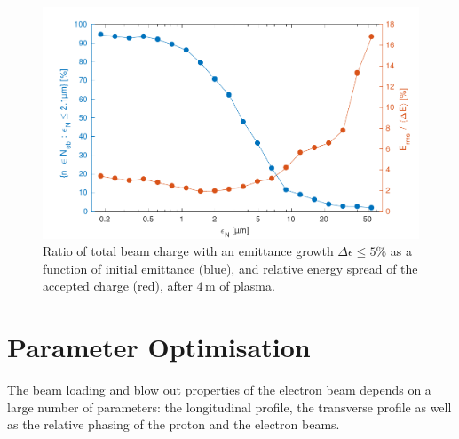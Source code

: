 \documentclass[aps,prstab,reprint,amsmath,amssymb,groupedaddress]{revtex4-1}
\newcommand{\unit}[1]{\,\mathrm{#1}}
\begin{document}
\begin{figure}[hbt]
    \includegraphics[width=\linewidth,trim={2mm 0mm 2mm 0mm},clip]{figures/beamQualityEmittance}
    \caption{\label{Fig:BeamQEmit} Ratio of total beam charge with an emittance growth $\Delta\epsilon \leq 5\%$ as a
        function of initial emittance (blue), and relative energy spread of the accepted charge (red), after $4\unit{m}$
        of plasma.}
\end{figure}

\section{Parameter Optimisation}\label{S:PO}

The beam loading and blow out properties of the electron beam depends on a large number of parameters: the longitudinal
profile, the transverse profile as well as the relative phasing of the proton and the electron beams.
\end{document}
